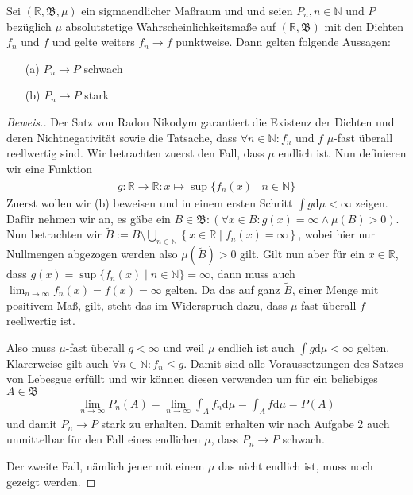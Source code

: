 \begin{lemma}
    Sei $(\mathbb{R},\mathfrak{B},\mu)$ ein sigmaendlicher Maßraum und und seien $P_n,n\in\mathbb{N}$ und $P$ bezüglich $\mu$ absolutstetige Wahrscheinlichkeitsmaße auf $(\mathbb{R},\mathfrak{B})$ mit den Dichten $f_n$ und $f$ und gelte weiters $f_n\to f$ punktweise. Dann gelten folgende Aussagen:
    \begin{itemize}
        \item[(a)] $P_n\to P$ schwach
        \item[(b)] $P_n\to P$ stark 
    \end{itemize}
\end{lemma}
\begin{proof}[Beweis.]
    Der Satz von Radon Nikodym \cite[Satz 11.19]{zbMATH06257850} garantiert die Existenz der Dichten und deren Nichtnegativität sowie die Tatsache, dass $\forall n\in\mathbb{N}:f_n$ und $f$ $\mu$-fast überall reellwertig sind.
    Wir betrachten zuerst den Fall, dass $\mu$ endlich ist. Nun definieren wir eine Funktion
    \begin{align*}
        g:\mathbb{R}\to\overline{\mathbb{R}}:x\mapsto\sup\{f_n(x)\mid n\in\mathbb{N}\}
    \end{align*}
    Zuerst wollen wir (b) beweisen und in einem ersten Schritt $\int g\mathrm{d}\mu<\infty$ zeigen. Dafür nehmen wir an, es gäbe ein $B\in\mathfrak{B}:\left(\forall x\in B:g(x)=\infty\land\mu(B)>0\right)$. Nun betrachten wir $\tilde{B}:=B\setminus\bigcup_{n\in\mathbb{N}}\left\{x\in\mathbb{R}\mid f_n(x)=\infty\right\}$, wobei hier nur Nullmengen abgezogen werden also $\mu\left(\tilde{B}\right)>0$ gilt. Gilt nun aber für ein $x\in\mathbb{R}$, dass $g(x)=\sup\{f_n(x)\mid n\in\mathbb{N}\}=\infty$, dann muss auch $\lim_{n\to\infty}f_n(x)=f(x)=\infty$ gelten. Da das auf ganz $\tilde{B}$, einer Menge mit positivem Maß, gilt, steht das im Widerspruch dazu, dass $\mu$-fast überall $f$ reellwertig ist. 
    
    Also muss $\mu$-fast überall $g<\infty$ und weil $\mu$ endlich ist auch $\int g\mathrm{d}\mu<\infty$ gelten. Klarerweise gilt auch $\forall n\in\mathbb{N}:f_n\leq g$. Damit sind alle Voraussetzungen des Satzes von Lebesgue \cite[Satz 9.33]{zbMATH06257850} erfüllt und wir können diesen verwenden um für ein beliebiges $A\in\mathfrak{B}$
    \begin{align*}
        \lim_{n\to\infty}P_n(A)=\lim_{n\to\infty}\int_Af_n\mathrm{d}\mu=\int_A f\mathrm{d}\mu=P(A)
    \end{align*}
    und damit $P_n\to P$ stark zu erhalten. Damit erhalten wir nach Aufgabe 2 auch unmittelbar für den Fall eines endlichen $\mu$, dass $P_n\to P$ schwach.

    Der zweite Fall, nämlich jener mit einem $\mu$ das nicht endlich ist, muss noch gezeigt werden.
\end{proof}
